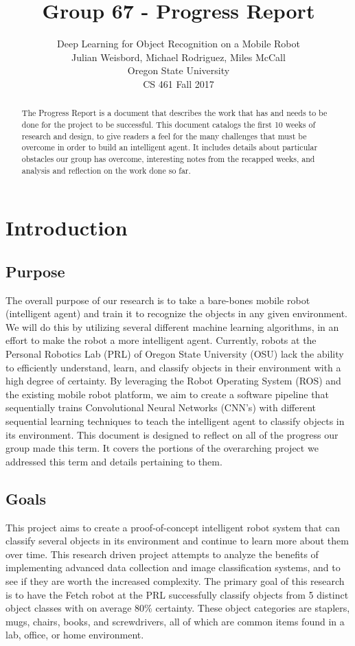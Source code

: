 \documentclass[draftclsnofoot, onecolumn, 10pt, compsoc]{IEEEtran}
\title{Group 67 - Progress Report}
\author{
            Deep Learning for Object Recognition on a Mobile Robot \\
            Julian Weisbord, Michael Rodriguez, Miles McCall \\
            Oregon State University \\
            CS 461 Fall 2017
		}
\begin{document}
\maketitle

\begin{abstract}
The Progress Report is a document that describes the work that has and needs to be done for the project to be successful. This document catalogs the first 10 weeks of research and design, to give readers a feel for the many challenges that must be overcome in order to build an intelligent agent. It includes details about particular obstacles our group has overcome, interesting notes from the recapped weeks, and analysis and reflection on the work done so far. 
\end{abstract}
\newpage


\tableofcontents
\newpage

\newpage
\section{Introduction}

\subsection{Purpose}
The overall purpose of our research is to take a bare-bones mobile robot (intelligent agent) and train it to recognize the objects in any given environment. We will do this by utilizing several different machine learning algorithms, in an effort to make the robot a more intelligent agent. Currently, robots at the Personal Robotics Lab (PRL) of Oregon State University (OSU) lack the ability to efficiently understand, learn, and classify objects in their environment with a high degree of certainty. By leveraging the Robot Operating System (ROS) and the existing mobile robot platform, we aim to create a software pipeline that sequentially trains Convolutional Neural Networks (CNN's) with different sequential learning techniques to teach the intelligent agent to classify objects in its environment. 
This document is designed to reflect on all of the progress our group made this term. It covers the portions of the overarching project we addressed this term and details pertaining to them. 

\subsection{Goals}
This project aims to create a proof-of-concept intelligent robot system that can classify several objects in its environment and continue to learn more about them over time. This research driven project attempts to analyze the benefits of implementing advanced data collection and image classification systems, and to see if they are worth the increased complexity. The primary goal of this research is to have the Fetch robot at the PRL successfully classify objects from 5 distinct object classes with on average 80\% certainty. These object categories are staplers, mugs, chairs, books, and screwdrivers, all of which are common items found in a lab, office, or home environment.
\end{document}
